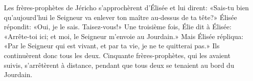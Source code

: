 Les frères-prophètes de Jéricho s’approchèrent d’Élisée et lui dirent:
	«Sais-tu bien qu’aujourd’hui le Seigneur va enlever ton maître au-dessus de ta tête?»
	Élisée répondit: «Oui, je le sais. Taisez-vous!»
Une troisième fois, Élie dit à Élisée:
	«Arrête-toi ici; et moi, le Seigneur m’envoie au Jourdain.»
Mais Élisée répliqua:
	«Par le Seigneur qui est vivant, et par ta vie, je ne te quitterai pas.»
Ils continuèrent donc tous les deux.
Cinquante frères-prophètes, qui les avaient suivis, s’arrêtèrent à distance,
	pendant que tous deux se tenaient au bord du Jourdain.
